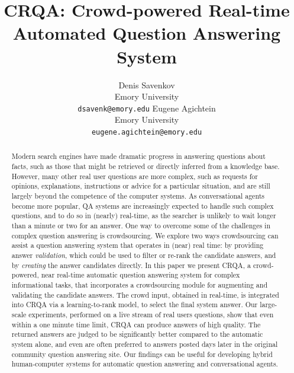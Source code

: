 \documentclass[letterpaper]{article}
\begin{document}
%
\title{CRQA: Crowd-powered Real-time Automated Question Answering System}
\author{
	Denis Savenkov\\
	Emory University\\
	\texttt{dsavenk@emory.edu}
\And
	Eugene Agichtein\\
	Emory University\\
	\texttt{eugene.agichtein@emory.edu}
}

\maketitle
\begin{abstract}
Modern search engines have made dramatic progress in answering questions about facts, such as those that might be retrieved or directly inferred from a knowledge base.
However, many other real user questions are more complex, such as requests for opinions, explanations, instructions or advice for a particular situation, and are still largely beyond the competence of the computer systems.
As conversational agents become more popular, QA systems are increasingly expected to handle such complex questions, and to do so in (nearly) real-time, as the searcher is unlikely to wait longer than a minute or two for an answer.
One way to overcome some of the challenges in complex question answering is crowdsourcing.
We explore two ways crowdsourcing can assist a question answering system that operates in (near) real time: by providing answer {\em validation}, which could be used to filter or re-rank the candidate answers, and by {\em creating} the answer candidates directly.
In this paper we present CRQA, a crowd-powered, near real-time automatic question answering system for complex informational tasks, that incorporates a crowdsourcing module for augmenting and validating the candidate answers.
The crowd input, obtained in real-time, is integrated into CRQA via a learning-to-rank model, to select the final system answer.
Our large-scale experiments, performed on a live stream of real users questions, show that even within a one minute time limit, CRQA can produce answers of high quality.
The returned answers are judged to be significantly better compared to the automatic system alone, and even are often preferred to answers posted days later in the original community question answering site.
Our findings can be useful for developing hybrid human-computer systems for automatic question answering and conversational agents.
\end{abstract}
\end{document}
